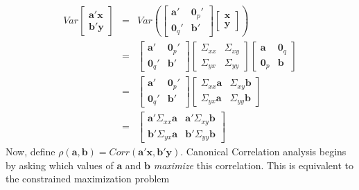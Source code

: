 \documentclass[12pt]{article}
\theoremstyle{definition}
\begin{document}
\begin{eqnarray*}
  Var\left[\begin{array}
    {c} \mathbf{a}'\textbf{x} \\ \mathbf{b}'\textbf{y}
  \end{array}\right] &=& Var\left(\left[ \begin{array}
    {cc} \mathbf{a}' & \mathbf{0}_p' \\
       \mathbf{0}_q' & \mathbf{b}'
  \end{array}\right] \left[\begin{array}
    {c} \textbf{x} \\ \textbf{y}
  \end{array}\right]\right)\\
  &=& \left[ \begin{array}
    {cc} \mathbf{a}' & \mathbf{0}_p' \\
       \mathbf{0}_q' & \mathbf{b}'
  \end{array}\right]\left[ \begin{array}
    {cc} \Sigma_{xx} & \Sigma_{xy}\\
    \Sigma_{yx} & \Sigma_{yy}
  \end{array}\right] \left[ \begin{array}
    {cc} \mathbf{a} & \mathbf{0}_q \\
      \mathbf{0}_p & \mathbf{b}
  \end{array}\right]\\
  &=& \left[ \begin{array}
    {cc} \mathbf{a}' & \mathbf{0}_p' \\
       \mathbf{0}_q' & \mathbf{b}'
  \end{array}\right] \left[\begin{array}
    {cc}
    \Sigma_{xx} \mathbf{a} & \Sigma_{xy} \mathbf{b}\\
    \Sigma_{yx} \mathbf{a} & \Sigma_{yy} \mathbf{b}
  \end{array} \right]\\
    &=& \left[ \begin{array}
      {cc}
      \mathbf{a}'\Sigma_{xx}\mathbf{a} & \mathbf{a}'\Sigma_{xy}\mathbf{b} \\
      \mathbf{b}'\Sigma_{yx} \mathbf{a}& \mathbf{b}' \Sigma_{yy} \mathbf{b}
    \end{array}\right]
\end{eqnarray*}
Now, define $\rho(\mathbf{a}, \mathbf{b}) = Corr(\textbf{a}'\textbf{x}, \textbf{b}'\textbf{y})$. Canonical Correlation analysis begins by asking which values of $\mathbf{a}$ and $\mathbf{b}$ \emph{maximize} this correlation. This is equivalent to the constrained maximization problem
\end{document}
